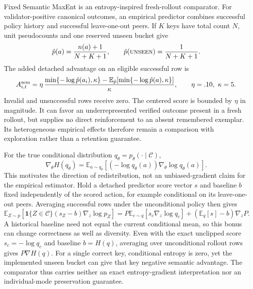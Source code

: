 \documentclass{article}
\newcommand{\1}{\mathbf 1}
\newcommand{\E}{\mathbb E}
\theoremstyle{remark}
\theoremstyle{definition}
\theoremstyle{plain}
\begin{document}
Fixed Semantic MaxEnt is an entropy-inspired fresh-rollout comparator.
For validator-positive canonical outcomes, an empirical predictor combines
successful policy history and successful leave-one-out peers. If $K$ keys
have total count $N$, unit pseudocounts and one reserved unseen bucket give
\begin{equation}
  \hat p(a)=\frac{n(a)+1}{N+K+1},\qquad
  \hat p(\textsc{unseen})=\frac{1}{N+K+1}.
  \label{eq:open-set-predictor}
\end{equation}
The added detached advantage on an eligible successful row is
\begin{equation}
  A^{\rm sem}_{i,t}=\eta\,
  \frac{\min\{-\log\hat p(a_i),\kappa\}
    -\E_{\hat p}[\min\{-\log\hat p(a),\kappa\}]}{\kappa},
  \qquad \eta=.10,\ \kappa=5.
  \label{eq:legacy-semantic-advantage}
\end{equation}
\label{app:legacy-semantic-estimator}
\label{app:semantic-estimator}
Invalid and unsuccessful rows receive zero. The centered score is bounded
by $\eta$ in magnitude. It can favor an underrepresented verified outcome
present in a fresh rollout, but supplies no direct reinforcement to an
absent remembered exemplar. Its heterogeneous empirical effects therefore
remain a comparison with exploration rather than a retention guarantee.

For the true conditional distribution $q_\theta=p_\theta(\cdot\mid\mathcal C)$,
\begin{equation}
 \nabla_\theta H(q_\theta)
 =\E_{a\sim q_\theta}[(-\log q_\theta(a))\nabla_\theta\log q_\theta(a)].
 \label{eq:entropy-score-function}
\end{equation}
This motivates the direction of redistribution, not an unbiased-gradient
claim for the empirical estimator. Hold a detached predictor score vector
$s$ and baseline $b$ fixed independently of the scored action, for example
conditional on its leave-one-out peers. Averaging successful rows under the
unconditional policy then gives
\[
 \E_{Z\sim p}[\1\{Z\in\mathcal C\}(s_Z-b)\nabla_z\log p_Z]
 =P\E_{c\sim q}[s_c\nabla_z\log q_c]
   +(\E_q[s]-b)\nabla_zP.
\]
A historical baseline need not equal the current conditional mean, so this
bonus can change correctness as well as diversity. Even with the exact
unclipped score $s_c=-\log q_c$ and baseline $b=H(q)$, averaging over
unconditional rollout rows gives $P\nabla H(q)$.
For a single correct key, conditional entropy is zero, yet the implemented
unseen bucket can give that key negative semantic advantage. The comparator
thus carries neither an exact entropy-gradient interpretation nor an
individual-mode preservation guarantee.
\end{document}
